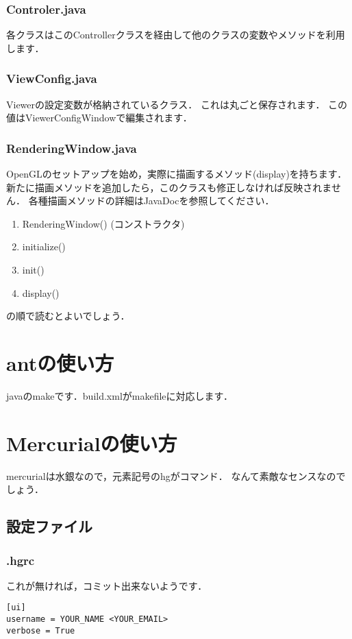 \documentclass[a4j,openany]{jbook}
\begin{document}
  \subsection{Controler.java}
  各クラスはこのControllerクラスを経由して他のクラスの変数やメソッドを利用します．

  \subsection{ViewConfig.java}
  Viewerの設定変数が格納されているクラス．
  これは丸ごと保存されます．
  この値はViewerConfigWindowで編集されます．

  \subsection{RenderingWindow.java}
  OpenGLのセットアップを始め，実際に描画するメソッド(display)を持ちます．
  新たに描画メソッドを追加したら，このクラスも修正しなければ反映されません．
  各種描画メソッドの詳細はJavaDocを参照してください．

  \begin{enumerate}
   \item RenderingWindow() (コンストラクタ)
   \item initialize()
   \item init()
   \item display()
  \end{enumerate}
  の順で読むとよいでしょう．


 \appendix
\chapter{antの使い方}
javaのmakeです．build.xmlがmakefileに対応します．
\chapter{Mercurialの使い方}
mercurialは水銀なので，元素記号のhgがコマンド．
なんて素敵なセンスなのでしょう．

\section{設定ファイル}
\subsection{.hgrc}
これが無ければ，コミット出来ないようです．
 \begin{screen}
\begin{verbatim}
[ui]
username = YOUR_NAME <YOUR_EMAIL>
verbose = True
\end{verbatim}
 \end{screen}
\end{document}
